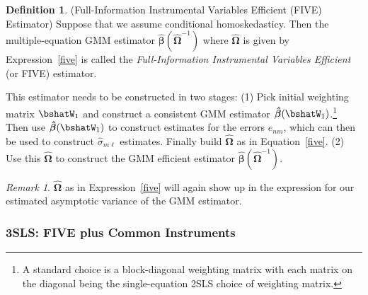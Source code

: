 \documentclass[12pt]{article}
\theoremstyle{plain}
\theoremstyle{definition}
\newtheorem{defn}[thm]{Definition}
\theoremstyle{remark}
\newtheorem*{rmk}{Remark}
\newcommand{\bshatbeta}{\boldsymbol{\hat{\beta}}}
\newcommand{\bshatOmega}{\boldsymbol{\hat{\Omega}}}
\begin{document}
\begin{defn}
(Full-Information Instrumental Variables Efficient (FIVE) Estimator)
Suppose that we assume conditional homoskedasticy. Then the
multiple-equation GMM estimator $\bshatbeta(\bshatOmega^{-1})$ where
$\bshatOmega$ is given by Expression~\ref{five} is called the
\emph{Full-Information Instrumental Variables Efficient} (or FIVE)
estimator.

This estimator needs to be constructed in two stages: (1) Pick
initial weighting matrix $\bshatW_1$ and construct a consistent GMM
estimator $\bshatbeta(\bshatW_1)$.\footnote{%
  A standard choice is a block-diagonal weighting matrix with each
  matrix on the diagonal being the single-equation 2SLS choice of
  weighting matrix.
}
Then use $\bshatbeta(\bshatW_1)$ to
construct estimates for the errors $e_{nm}$, which can then be used to
construct $\hat{\sigma}_{m\ell}$ estimates. Finally build $\bshatOmega$
as in Equation~\ref{five}. (2) Use this $\bshatOmega$ to construct the
GMM efficient estimator $\bshatbeta(\bshatOmega^{-1})$.
\end{defn}

\begin{rmk}
$\bshatOmega$ as in Expression~\ref{five} will again show up in the
expression for our estimated asymptotic variance of the GMM estimator.
\end{rmk}

\subsubsection{3SLS: FIVE plus Common Instruments}
\end{document}
